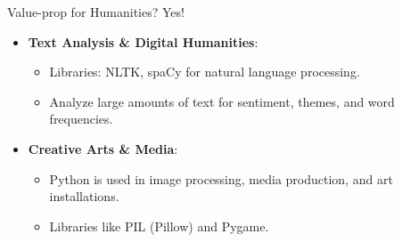 \documentclass[
  ignorenonframetext,
]{beamer}
\providecommand{\tightlist}{%
  \setlength{\itemsep}{0pt}\setlength{\parskip}{0pt}}
\begin{document}
\begin{frame}{Value-prop for Humanities?}
\label{value-prop-for-humanities}
Yes!

\begin{itemize}
\tightlist
\item
  \textbf{Text Analysis \& Digital Humanities}:

  \begin{itemize}
  \tightlist
  \item
    Libraries: NLTK, spaCy for natural language processing.
  \item
    Analyze large amounts of text for sentiment, themes, and word
    frequencies.
  \end{itemize}
\item
  \textbf{Creative Arts \& Media}:

  \begin{itemize}
  \tightlist
  \item
    Python is used in image processing, media production, and art
    installations.
  \item
    Libraries like PIL (Pillow) and Pygame.
  \end{itemize}
\end{itemize}
\end{frame}
\end{document}
